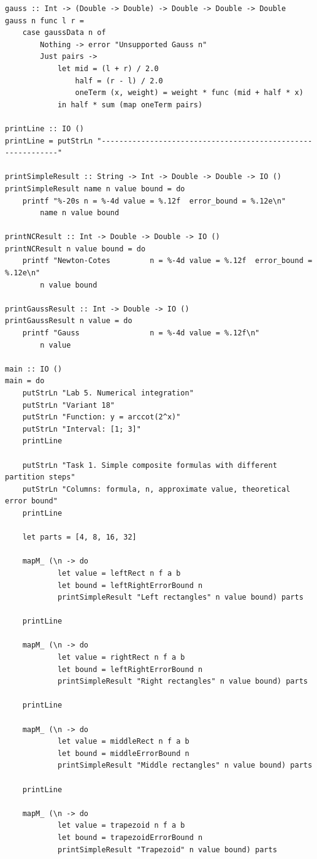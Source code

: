 \documentclass[14pt,a4paper]{extarticle}
\begin{document}
\begin{lstlisting}[caption={Файл Main.hs}, label={lst:lab6code}]
gauss :: Int -> (Double -> Double) -> Double -> Double -> Double
gauss n func l r =
    case gaussData n of
        Nothing -> error "Unsupported Gauss n"
        Just pairs ->
            let mid = (l + r) / 2.0
                half = (r - l) / 2.0
                oneTerm (x, weight) = weight * func (mid + half * x)
            in half * sum (map oneTerm pairs)

printLine :: IO ()
printLine = putStrLn "------------------------------------------------------------"

printSimpleResult :: String -> Int -> Double -> Double -> IO ()
printSimpleResult name n value bound = do
    printf "%-20s n = %-4d value = %.12f  error_bound = %.12e\n"
        name n value bound

printNCResult :: Int -> Double -> Double -> IO ()
printNCResult n value bound = do
    printf "Newton-Cotes         n = %-4d value = %.12f  error_bound = %.12e\n"
        n value bound

printGaussResult :: Int -> Double -> IO ()
printGaussResult n value = do
    printf "Gauss                n = %-4d value = %.12f\n"
        n value

main :: IO ()
main = do
    putStrLn "Lab 5. Numerical integration"
    putStrLn "Variant 18"
    putStrLn "Function: y = arccot(2^x)"
    putStrLn "Interval: [1; 3]"
    printLine

    putStrLn "Task 1. Simple composite formulas with different partition steps"
    putStrLn "Columns: formula, n, approximate value, theoretical error bound"
    printLine

    let parts = [4, 8, 16, 32]

    mapM_ (\n -> do
            let value = leftRect n f a b
            let bound = leftRightErrorBound n
            printSimpleResult "Left rectangles" n value bound) parts

    printLine

    mapM_ (\n -> do
            let value = rightRect n f a b
            let bound = leftRightErrorBound n
            printSimpleResult "Right rectangles" n value bound) parts

    printLine

    mapM_ (\n -> do
            let value = middleRect n f a b
            let bound = middleErrorBound n
            printSimpleResult "Middle rectangles" n value bound) parts

    printLine

    mapM_ (\n -> do
            let value = trapezoid n f a b
            let bound = trapezoidErrorBound n
            printSimpleResult "Trapezoid" n value bound) parts


\end{lstlisting}
\end{document}
